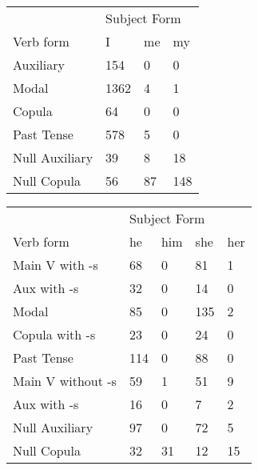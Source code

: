\begin{table}[]
\begin{minipage}{0.5\textwidth}
    \centering
    \begin{tabular}{@{}llll@{}}
        \toprule
            &\multicolumn{3}{l}{Subject Form}\\
            \cline{2-4}
        Verb form & I & me & my \\
        \midrule
        Auxiliary & 154 & 0 & 0 \\
        Modal & 1362 & 4 & 1 \\
        Copula & 64 & 0 & 0 \\
        Past Tense & 578 & 5 & 0 \\
        \hline
        Null Auxiliary & 39 & 8 & 18 \\
        Null Copula & 56 & 87 & 148 \\
        \bottomrule
    \end{tabular}
\end{minipage}
\begin{minipage}{0.5\textwidth}
    \centering
    \begin{tabular}{@{}lllll@{}}
        \toprule
            &\multicolumn{4}{l}{Subject Form}\\
            \cline{2-5}
        Verb form & he & him & she & her \\
        \midrule
        Main V with -s & 68 & 0 & 81 & 1 \\
        Aux with -s & 32 & 0 & 14 & 0 \\
        Modal & 85 & 0 & 135 & 2 \\
        Copula with -s & 23 & 0 & 24 & 0 \\
        Past Tense & 114 & 0 & 88 & 0 \\
        \hline
        Main V without -s & 59 & 1 & 51 & 9 \\
        Aux with -s & 16 & 0 & 7 & 2 \\
        Null Auxiliary & 97 & 0 & 72 & 5 \\
        Null Copula & 32 & 31 & 12 & 15 \\
        \bottomrule
    \end{tabular}
    \end{minipage}
\end{table}
